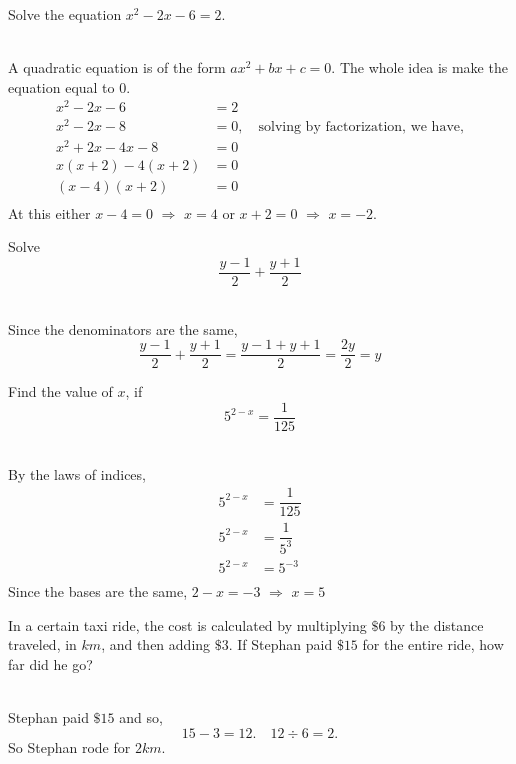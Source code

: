 \documentclass[addpoints,12pt]{exam}
\begin{document}
\begin{questions}
\begin{solution}
	  \end{solution}
	\else
	  \makeemptybox{1.33in}
	\fi
 
 \question Solve the equation $x^2-2x -6=2$.
	\ifprintanswers
	  \begin{solution}\\
		A quadratic equation is of the form $ax^2+bx+c=0$. The whole idea is make the equation 
equal to $0$.
		\begin{align*}
		  x^2-2x -6 &= 2 \\
		  x^2-2x -8 &= 0, \quad \text{solving by factorization, we have,} \\
		  x^2+2x -4x -8 &= 0 \\
		  x(x+2)-4(x+2) &= 0 \\
		  (x-4)(x+2) &= 0 \\
		\end{align*}
		At this either $x-4 = 0$ $\Rightarrow$ $x=4$ or $x+2=0$ $\Rightarrow$ $x=-2$. 
	  \end{solution}
	\else
	  \makeemptybox{1.33in}
	\fi

 \question Solve $$\frac{y-1}{2}+\frac{y+1}{2}$$
	\ifprintanswers
	  \begin{solution}\\
		Since the denominators are the same, 
		$$\frac{y-1}{2}+\frac{y+1}{2}=\frac{y-1+y+1}{2}=\frac{2y}{2}=y$$
	  \end{solution}
	\else
	  \makeemptybox{1.33in}
	\fi
	
 \question Find the value of $x$, if $$5^{2-x} = \dfrac{1}{125}$$
	\ifprintanswers
	  \begin{solution}\\
		By the laws of indices, 
		\begin{align*}
		  5^{2-x} &= \dfrac{1}{125} \\
		  5^{2-x} &= \dfrac{1}{5^3} \\
		  5^{2-x} &= 5^{-3} \\
		\end{align*}
		Since the bases are the same, $2-x=-3$ $\Rightarrow$ $x=5$
	  \end{solution}
	\else
	  \makeemptybox{1.33in}
	\fi
	
 \question In a certain taxi ride, the cost is calculated by multiplying $\$6$ by the 
distance traveled, in $km$, and then adding $\$3$. If Stephan paid $\$15$ for the entire ride, how 
far did he go?
	\ifprintanswers
	  \begin{solution}\\
		Stephan paid $\$15$ and so,
		$$15-3=12. \quad 12 \div 6 = 2.$$
		So Stephan rode for $2km$.
	  \end{solution}
	\else
	  \makeemptybox{1.33in}
	\fi
	

\end{questions}
\end{document}
